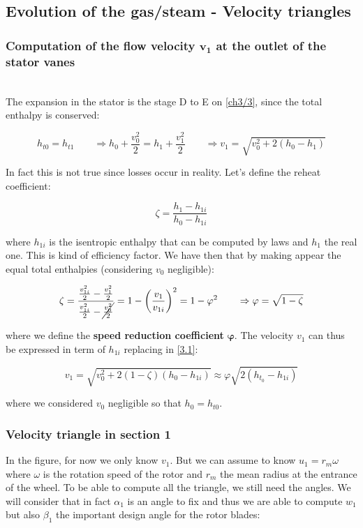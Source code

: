 \subsection{Evolution of the gas/steam - Velocity triangles}
\subsubsection{Computation of the flow velocity $\bm{v_1}$ at the outlet of the stator vanes}\ \\
The expansion in the stator is the stage D to E on \autoref{ch3/3}, since the total enthalpy is conserved: 

\begin{equation}
h_{t0} = h_{t1} \qquad \Rightarrow h_0 + \frac{v_0^2}{2} = h_1 + \frac{v_{1}^2}{2}\qquad \Rightarrow v_1 = \sqrt{v_0^2 + 2(h_0- h_1)}
\label{3.1}
\end{equation}

In fact this is not true since losses occur in reality. Let's define the reheat coefficient:

\begin{equation}
\zeta = \frac{h_1 - h_{1i}}{h_0 - h_{1i}}
\end{equation}

where $h_{1i}$ is the isentropic enthalpy that can be computed by laws and $h_1$ the real one. This is kind of efficiency factor. We have then that by making appear the equal total enthalpies (considering $v_0$ negligible):

\begin{equation}
\zeta = \frac{\frac{v_{1i}^2}{2} - \frac{v_{1}^2}{2}}{\frac{v_{1i}^2}{2} - \cancel{\frac{v_{0}^2}{2}}} = 1-\left( \frac{v_1}{v_{1i}} \right)^2 = 1 - \varphi ^2 \qquad \Rightarrow \varphi = \sqrt{1 - \zeta} 
\end{equation}

where we define the \textbf{speed reduction coefficient} $\bm{\varphi}$. The velocity $v_1$ can thus be expressed in term of $h_{1i}$ replacing in \eqref{3.1}:  

\begin{equation}
v_1 = \sqrt{v_0^2 + 2 (1-\zeta)(h_0 - h_{1i})} \approx \varphi \sqrt{2(h_{t_0} - h_{1i})}
\end{equation}

where we considered $v_0$ negligible so that $h_0 = h_{t0}$.

\subsubsection{Velocity triangle in section 1}
In the figure, for now we only know $v_1$. But we can assume to know $u_1 = r_m \omega$ where $\omega$ is the rotation speed of the rotor and $r_m$ the mean radius at the entrance of the wheel. To be able to compute all the triangle, we still need the angles. We will consider that in fact $\alpha _1$ is an angle to fix and thus we are able to compute $w_1$ but also $\beta _1$ the important design angle for the rotor blades: 

